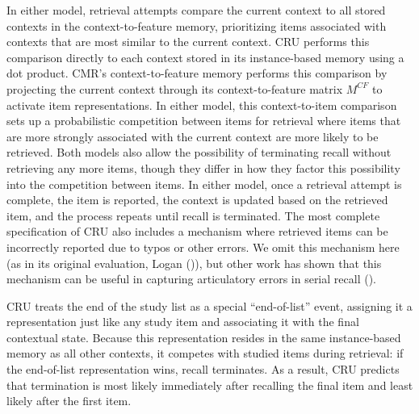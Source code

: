 \documentclass[
  man,
  floatsintext,
  longtable,
  nolmodern,
  notxfonts,
  notimes,
  draftfirst,
  colorlinks=true,linkcolor=blue,citecolor=blue,urlcolor=blue]{apa7}
\begin{document}
In either model, retrieval attempts compare the current context to all
stored contexts in the context-to-feature memory, prioritizing items
associated with contexts that are most similar to the current context.
CRU performs this comparison directly to each context stored in its
instance-based memory using a dot product. CMR's context-to-feature
memory performs this comparison by projecting the current context
through its context-to-feature matrix \(M^{CF}\) to activate item
representations. In either model, this context-to-item comparison sets
up a probabilistic competition between items for retrieval where items
that are more strongly associated with the current context are more
likely to be retrieved. Both models also allow the possibility of
terminating recall without retrieving any more items, though they differ
in how they factor this possibility into the competition between items.
In either model, once a retrieval attempt is complete, the item is
reported, the context is updated based on the retrieved item, and the
process repeats until recall is terminated. The most complete
specification of CRU also includes a mechanism where retrieved items can
be incorrectly reported due to typos or other errors. We omit this
mechanism here (as in its original evaluation, Logan
()), but other work has shown that
this mechanism can be useful in capturing articulatory errors in serial
recall ().

CRU treats the end of the study list as a special ``end-of-list'' event,
assigning it a representation just like any study item and associating
it with the final contextual state. Because this representation resides
in the same instance-based memory as all other contexts, it competes
with studied items during retrieval: if the end-of-list representation
wins, recall terminates. As a result, CRU predicts that termination is
most likely immediately after recalling the final item and least likely
after the first item.
\end{document}
